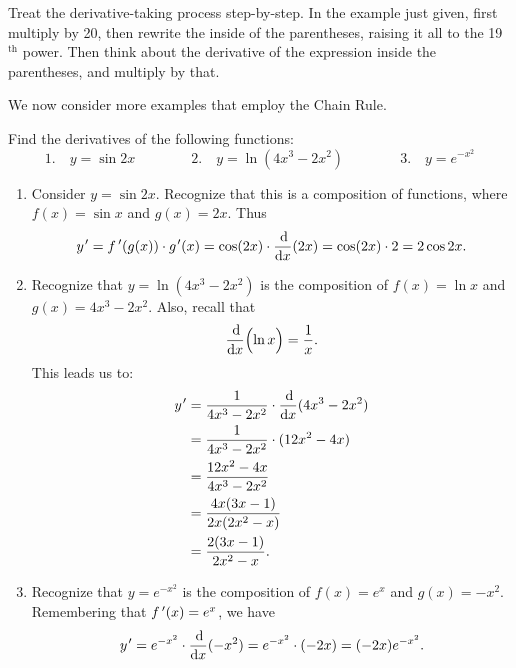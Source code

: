 Treat the derivative-taking process step-by-step. In the example just given, first multiply by 20, then rewrite the inside of the parentheses, raising it all to the 19$^{\text{th}}$ power. Then think about the derivative of the expression inside the parentheses, and multiply by that.


We now consider more examples that employ the Chain Rule.

\begin{example}\label{ex_chain3}%
Find the derivatives of the following functions:
\[
 1.\quad y = \sin{2x}\qquad\qquad
 2.\quad y= \ln (4x^3-2x^2)\qquad\qquad
 3.\quad y = e^{-x^2}
\]
\solution
\begin{enumerate}
	\item	Consider $y = \sin 2x$. Recognize that this is a composition of functions, where $f(x) = \sin x$ and $g(x) = 2x$. Thus
	\[
	 y\primeskip' = \fp(g(x))\cdot g\primeskip'(x)
	 =\cos (2x) \cdot \frac{\dd}{\dd x}(2x)= \cos (2x)\cdot 2 = 2\cos 2x.
	\]
	\item	Recognize that $y = \ln (4x^3-2x^2)$ is the composition of $f(x) = \ln x$ and $g(x) = 4x^3-2x^2$. Also, recall that
	\[\frac{\operatorname{d}\!}{\operatorname{d}\! x}\Bigl(\ln x\Bigr) = \frac{1}{x}.\]
	This leads us to:
	\begin{align*}
	 y\primeskip'
	 & = \frac{1}{4x^3-2x^2} \cdot \frac{\dd}{\dd x} (4x^3-2x^2) \\
	 & = \frac{1}{4x^3-2x^2} \cdot (12x^2-4x) \\
	 & = \frac{12x^2-4x}{4x^3-2x^2} \\
	 & = \frac{4x(3x-1)}{2x(2x^2-x)} \\
	 & = \frac{2(3x-1)}{2x^2-x}.
	\end{align*}
	\item	Recognize  that $y = e^{-x^2}$ is the composition of $f(x) = e^x$ and $g(x) = -x^2$. Remembering that $f\,'(x) = e^x$, we have
	\[
	 y\primeskip'=e^{-x^2}\cdot\frac{\dd}{\dd x}(-x^2)=e^{-x^2}\cdot(-2x)=(-2x)e^{-x^2}.
	\]
\end{enumerate}
\end{example}

